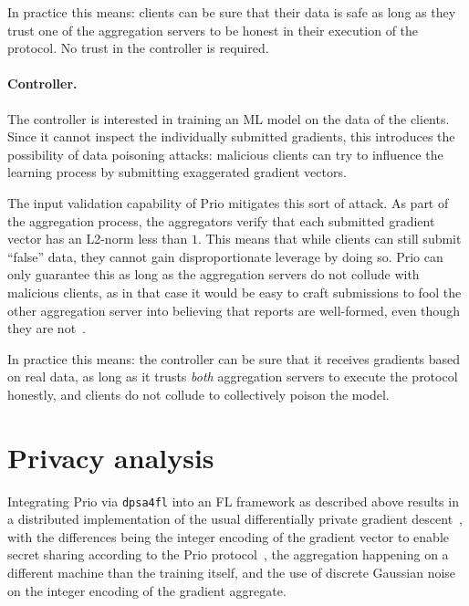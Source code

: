 \documentclass{article}
\begin{document}
In practice this means: clients can be sure that their data is safe as long as
they trust one of the aggregation servers to be honest in their execution of the
protocol. No trust in the controller is required.

\paragraph{Controller.} The controller is interested in training an ML model on
the data of the clients. Since it cannot inspect the individually submitted
gradients, this introduces the possibility of data poisoning attacks: malicious
clients can try to influence the learning process by submitting exaggerated
gradient vectors.

The input validation capability of Prio mitigates this sort of attack.
As part of the aggregation process, the aggregators verify that each submitted gradient vector
has an L2-norm less than $1$. This means that while clients can still submit
``false'' data, they cannot gain disproportionate leverage by doing so. Prio can only
guarantee this as long as the aggregation servers do not collude with malicious
clients, as in that case it would be easy to craft submissions to fool the other
aggregation server into believing that reports are well-formed, even though they
are not~\cite{prio}.

In practice this means: the controller can be sure that it receives gradients
based on real data, as long as it trusts \textit{both} aggregation servers to
execute the protocol honestly, and clients do not collude to collectively poison the model.





\section{Privacy analysis}

Integrating Prio via \texttt{dpsa4fl} into an FL framework as described above
results in a distributed implementation of the usual differentially
private gradient descent~\cite{Abadi_2016}, with the differences being the
integer encoding of the gradient vector to enable secret sharing according to
the Prio protocol~\cite{prio}, the aggregation happening on a different machine
than the training itself, and the use of discrete Gaussian noise on the integer
encoding of the gradient aggregate.
\end{document}
